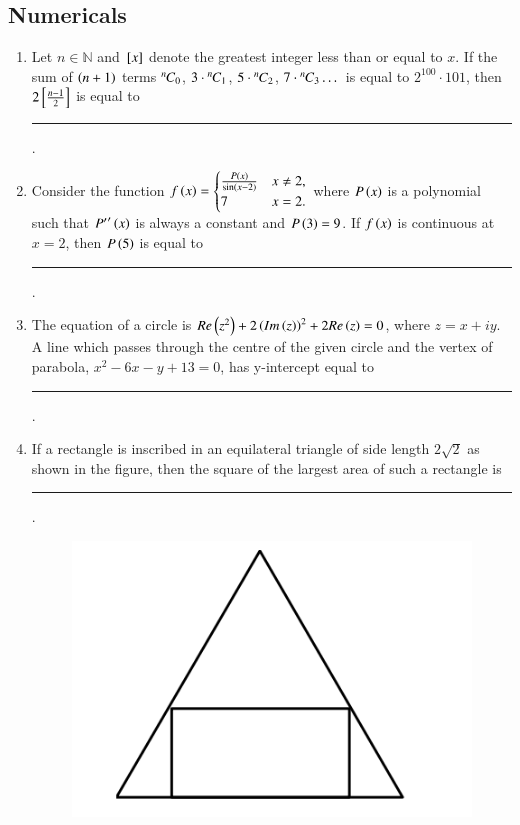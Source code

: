 \documentclass[journal,12pt,onecolumn]{IEEEtran}
\theoremstyle{remark}
\begin{document}
\subsection{Numericals}
\begin{enumerate}

\item Let $n\in \mathbb{N}$ and ${}\left[x\right]$ denote the greatest integer less than or equal to $x$. If the sum of $\left(n+1\right)$ terms ${{}^{n}\mkern-1muC_{0}}$, $3\cdot{{}^{n}\mkern-1muC_{1}}$, $5\cdot{{}^{n}\mkern-1muC_{2}}$, $7\cdot{{}^{n}\mkern-1muC_{3}} \dots$ is equal to $2^{100}\cdot 101$, then $2{}\left[\frac{n-1}{2}\right]$ is equal to \rule{1cm}{0.15mm}.

\hfill{}

\item Consider the function $f\left(x\right) = \begin{cases} \frac{P\left(x\right)}{\sin\left(x-2\right)} & x\neq 2, \\7 & x=2 .\end{cases}$ where $P\left(x\right)$ is a polynomial such that ${P^\prime}^\prime\left(x\right)$ is always a constant and $P\left(3\right)=9$. If $f\left(x\right)$ is continuous at $x=2$, then $P\left(5\right)$ is equal to \rule{1cm}{0.15mm}.

\hfill{}

\item The equation of a circle is $Re\left(z^2\right)+2\left(Im\left(z\right)\right)^2+2Re\left(z\right)=0$, where $z=x+iy$. A line which passes through the centre of the given circle and the vertex of parabola, $x^2-6x-y+13=0$, has y-intercept equal to \rule{1cm}{0.15mm}.

\hfill{}

\item If a rectangle is inscribed in an equilateral triangle of side length $2\sqrt{2}$ as shown in the figure, then the square of the largest area of such a rectangle is \rule{1cm}{0.15mm}.
\begin{figure}[h!]
   \centering
   \includegraphics[width=0.4\linewidth]{figs/fig1.png}
\end{figure}

\hfill{}


\end{enumerate}
\end{document}
